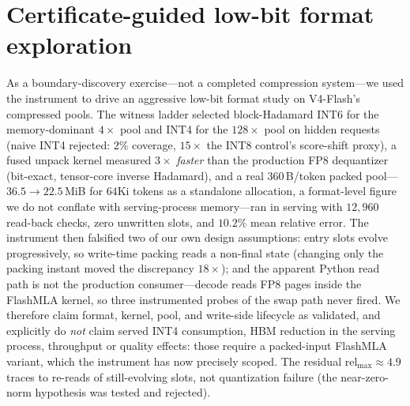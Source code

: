 \documentclass[11pt]{article}
\begin{document}
\section{Certificate-guided low-bit format exploration}
\label{app:casestudy}
As a boundary-discovery exercise---not a completed compression system---we
used the instrument to drive an aggressive low-bit format study on V4-Flash's
compressed pools. The witness ladder selected block-Hadamard INT6 for the
memory-dominant $4\times$ pool and INT4 for the $128\times$ pool on hidden
requests (naive INT4 rejected: $2\%$ coverage, $15\times$ the INT8 control's
score-shift proxy), a fused unpack kernel measured $3\times$ \emph{faster}
than the production FP8 dequantizer (bit-exact, tensor-core inverse
Hadamard), and a real $360$\,B/token packed pool---$36.5\to 22.5$\,MiB for
$64$Ki tokens as a standalone allocation, a format-level figure we do not
conflate with serving-process memory---ran in serving with
$12{,}960$ read-back checks, zero unwritten slots, and $10.2\%$ mean relative
error. The instrument then falsified two of our own design assumptions: entry
slots evolve progressively, so write-time packing reads a non-final state
(changing only the packing instant moved the discrepancy $18\times$); and the
apparent Python read path is not the production consumer---decode reads FP8
pages inside the FlashMLA kernel, so three instrumented probes of the swap
path never fired. We therefore claim format, kernel, pool, and write-side
lifecycle as validated, and explicitly do \emph{not} claim served INT4
consumption, HBM reduction in the serving process, throughput or quality
effects: those require a packed-input FlashMLA variant, which the instrument
has now precisely scoped. The residual $\mathrm{rel}_{\max}\approx 4.9$
traces to re-reads of still-evolving slots, not quantization failure
(the near-zero-norm hypothesis was tested and rejected).
\end{document}
